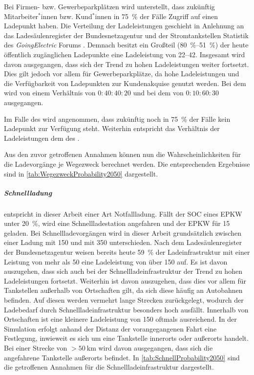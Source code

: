 Bei Firmen- bzw. Gewerbeparkplätzen wird unterstellt, dass zukünftig Mitarbeiter$^*$innen bzw. Kund$^*$innen in \SI{75}{\percent} der Fälle Zugriff auf einen Ladepunkt haben.
Die Verteilung der Ladeleistungen geschieht in Anlehnung an das Ladesäulenregister der Bundesnetzagentur \cite[][Stand: ]{BundesnetzagenturElektrizitaet2020} und der Stromtankstellen Statistik des \textit{GoingElectric} Forums \cite[][Stand: ]{Weemaes2020}.
Demnach besitzt ein Großteil (\SIrange[range-phrase=~bzw.~]{80}{51}{\percent}) der heute öffentlich zugänglichen Ladepunkte eine Ladeleistung von \SIrange{22}{42}{\kw}.
Insgesamt wird davon ausgegangen, dass sich der Trend zu hohen Ladeleistungen weiter fortsetzt.
Dies gilt jedoch vor allem für Gewerbeparkplätze, da hohe Ladeleistungen und die Verfügbarkeit von Ladepunkten zur Kundenakquise genutzt werden.
Bei dem \UC \Firmeparkplatz wird von einem Verhältnis von \(0:40:40:20\) und bei dem \UC \Gewerbeparkplatz von \(0:10:60:30\) ausgegangen.\medskip

Im Falle des \UC \Straszenrand wird angenommen, dass zukünftig noch in \SI{75}{\percent} der Fälle kein Ladepunkt zur Verfügung steht.
Weiterhin entspricht das Verhältnis der Ladeleistungen dem des \UC \Firmeparkplatzdot.\medskip

Aus den zuvor getroffenen Annahmen können nun die Wahrscheinlichkeiten für die Ladevorgänge je Wegezweck berechnet werden.
Die entsprechenden Ergebnisse sind in \autoref{tab:WegezweckProbability2050} dargestellt.




\subparagraph{Schnellladung} entspricht in dieser Arbeit einer Art Notfallladung.
Fällt der \gls{SOC} eines \gls{EPKW} unter \SI{20}{\percent}, wird eine Schnellladestation angefahren und der \gls{EPKW} für \SI{15}{\Minuten} geladen.
Bei Schnellladevorgängen wird in dieser Arbeit grundsätzlich zwischen einer Ladung mit \SI{150}{\kw} und mit \SI{350}{\kw} unterschieden.
Nach dem Ladesäulenregister der Bundesnetzagentur \cite[][Stand: ]{BundesnetzagenturElektrizitaet2020} weisen bereits heute \SI{59}{\percent} der Ladeinfrastruktur mit einer Leistung von mehr als \SI{50}{\kw} eine Ladeleistung von über \SI{150}{\kw} auf.
Es ist davon auszugehen, dass sich auch bei der Schnellladeinfrastruktur der Trend zu hohen Ladeleistungen fortsetzt.
Weiterhin ist davon auszugehen, dass dies vor allem für Tankstellen außerhalb von Ortschaften gilt, da sich diese häufig an Autobahnen befinden.
Auf diesen werden vermehrt lange Strecken zurückgelegt, wodurch der Ladebedarf durch Schnellladeinfrastruktur besonders hoch ausfällt.
Innerhalb von Ortschaften ist eine kleinere Ladeleistung von \SI{150}{\kw} oftmals ausreichend.
In der Simulation erfolgt anhand der Distanz der vorangegangenen Fahrt eine Festlegung, inwieweit es sich um eine Tankstelle innerorts oder außerorts handelt.
Bei einer Strecke von \(>\!\SI{50}{\km}\) wird davon ausgegangen, dass sich die angefahrene Tankstelle außerorts befindet.
In \autoref{tab:SchnellProbability2050} sind die getroffenen Annahmen für die Schnellladeinfrastruktur dargestellt.


